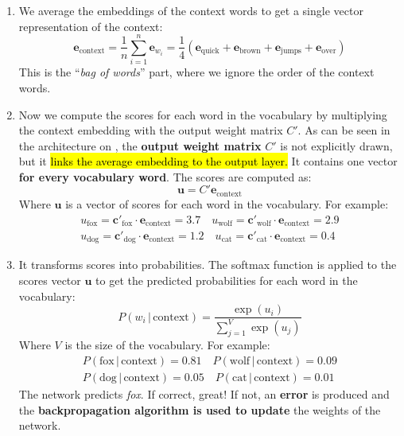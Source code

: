 \begin{enumerate}
    \item {} We average the embeddings of the context words to get a single vector representation of the context:
    \begin{equation*}
        \mathbf{e}_{\text{context}} = \frac{1}{n} \sum_{i=1}^{n} \mathbf{e}_{w_i} = \frac{1}{4} \left( \mathbf{e}_{\text{quick}} + \mathbf{e}_{\text{brown}} + \mathbf{e}_{\text{jumps}} + \mathbf{e}_{\text{over}} \right)
    \end{equation*}
    This is the ``\emph{bag of words}'' part, where we ignore the order of the context words.


    \item {} Now we compute the scores for each word in the vocabulary by multiplying the context embedding with the output weight matrix $C'$. As can be seen in the architecture on , the \textbf{output weight matrix} $C'$ is not explicitly drawn, but it \hl{links the average embedding to the output layer.} It contains one vector \textbf{for every vocabulary word}. The scores are computed as:
    \begin{equation*}
        \mathbf{u} = C' \mathbf{e}_{\text{context}}
    \end{equation*}
    Where $\mathbf{u}$ is a vector of scores for each word in the vocabulary. For example:
    \begin{gather*}
        u_{\text{fox}} = \mathbf{c}'_{\text{fox}} \cdot \mathbf{e}_{\text{context}} = 3.7 \quad
        u_{\text{wolf}} = \mathbf{c}'_{\text{wolf}} \cdot \mathbf{e}_{\text{context}} = 2.9 \\
        u_{\text{dog}} = \mathbf{c}'_{\text{dog}} \cdot \mathbf{e}_{\text{context}} = 1.2 \quad
        u_{\text{cat}} = \mathbf{c}'_{\text{cat}} \cdot \mathbf{e}_{\text{context}} = 0.4
    \end{gather*}


    \item {} It transforms scores into probabilities. The softmax function is applied to the scores vector $\mathbf{u}$ to get the predicted probabilities for each word in the vocabulary:
    \begin{equation*}
        P\left(w_i \, | \, \text{context}\right) = \frac{\exp(u_i)}{\sum_{j=1}^{V} \exp(u_j)}
    \end{equation*}
    Where $V$ is the size of the vocabulary. For example:
    \begin{gather*}
        P\left(\text{fox} \, | \, \text{context}\right) = 0.81 \quad
        P\left(\text{wolf} \, | \, \text{context}\right) = 0.09 \\
        P\left(\text{dog} \, | \, \text{context}\right) = 0.05 \quad
        P\left(\text{cat} \, | \, \text{context}\right) = 0.01
    \end{gather*}
    The network predicts \emph{fox}. If correct, great! If not, an \textbf{error} is produced and the \textbf{backpropagation algorithm is used to update} the weights of the network.
\end{enumerate}
